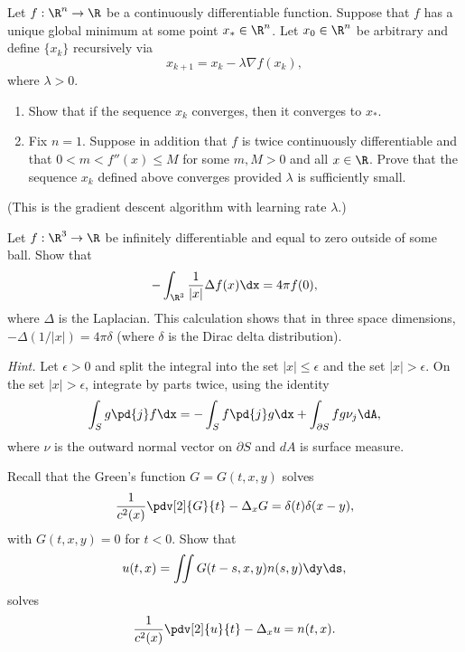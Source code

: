 \begin{problem}[4]
  Let $f : \R^n \to \R$ be a continuously differentiable function. Suppose that $f$ has a unique global minimum at some point $x_* \in \R^n$. Let $x_0 \in \R^n$ be arbitrary and define $\{x_k\}$ recursively via
  \[%
    x_{k+1} = x_k - \lambda\nabla f(x_k)
  ,\]%
  where $\lambda > 0$.

  \begin{enumerate}
    \item Show that if the sequence $x_k$ converges, then it converges to $x_*$.
    \item Fix $n = 1$. Suppose in addition that $f$ is twice continuously differentiable and that $0 < m < f''(x) \leq M$ for some $m, M > 0$ and all $x \in \R$. Prove that the sequence $x_k$  defined above converges provided $\lambda$ is sufficiently small.
  \end{enumerate}

  (This is the gradient descent algorithm with learning rate $\lambda$.)
\end{problem}

\begin{solution}[(i)]
\end{solution}

\begin{solution}[(ii)]
\end{solution}

\begin{problem}[5]
  Let $f : \R^3 \to \R$ be infinitely differentiable and equal to zero outside of some ball. Show that
  \[%
    -\int_{\R^3} \frac{1}{|x|} \Delta f(x) \dx = 4\pi f(0)
  ,\]%
  where $\Delta$ is the Laplacian. This calculation shows that in three space dimensions, $-\Delta(1/|x|) = 4\pi\delta$ (where $\delta$ is the Dirac delta distribution).

  \noindent \emph{Hint.} Let $\epsilon > 0$ and split the integral into the set $|x| \leq \epsilon$ and the set $|x| > \epsilon$. On the set $|x| > \epsilon$, integrate by parts twice, using the identity
  \[%
    \int_S g \pd{j} f \dx = -\int_S f\pd{j} g \dx + \int_{\partial S} fg \nu_j \dA
  ,\]%
  where $\nu$ is the outward normal vector on $\partial S$ and $dA$ is surface measure.
\end{problem}

\begin{solution}
\end{solution}

\begin{problem}[6]
  Recall that the Green's function $G = G(t, x, y)$ solves
  \[%
    \frac{1}{c^2(x)}\pdv[2]{G}{t} - \Delta_x G = \delta(t)\delta(x - y)
  ,\]%
  with $G(t, x, y) = 0$ for $t < 0$. Show that 
  \[%
    u(t,x) = \iint G(t - s, x, y) n(s, y)\dy\ds
  ,\]%
  solves
  \[%
    \frac{1}{c^2(x)}\pdv[2]{u}{t} - \Delta_x u = n(t, x)
  .\]%
\end{problem}

